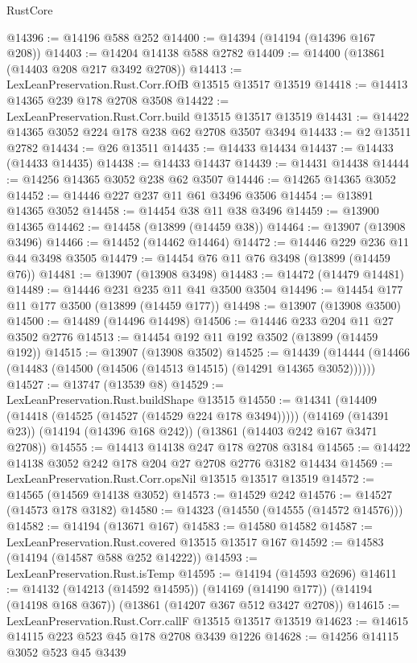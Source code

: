 \begin{lexlean}{RustCore}
\begin{coremodule}
@14396 := @14196 @588 @252
@14400 := @14394 (@14194 (@14396 @167 @208))
@14403 := @14204 @14138 @588 @2782
@14409 := @14400 (@13861 (@14403 @208 @217 @3492 @2708))
@14413 := LexLeanPreservation.Rust.Corr.fOfB @13515 @13517 @13519
@14418 := @14413 @14365 @239 @178 @2708 @3508
@14422 := LexLeanPreservation.Rust.Corr.build @13515 @13517 @13519
@14431 := @14422 @14365 @3052 @224 @178 @238 @62 @2708 @3507 @3494
@14433 := @2 @13511 @2782
@14434 := @26 @13511
@14435 := @14433 @14434
@14437 := @14433 (@14433 @14435)
@14438 := @14433 @14437
@14439 := @14431 @14438
@14444 := @14256 @14365 @3052 @238 @62 @3507
@14446 := @14265 @14365 @3052
@14452 := @14446 @227 @237 @11 @61 @3496 @3506
@14454 := @13891 @14365 @3052
@14458 := @14454 @38 @11 @38 @3496
@14459 := @13900 @14365
@14462 := @14458 (@13899 (@14459 @38))
@14464 := @13907 (@13908 @3496)
@14466 := @14452 (@14462 @14464)
@14472 := @14446 @229 @236 @11 @44 @3498 @3505
@14479 := @14454 @76 @11 @76 @3498 (@13899 (@14459 @76))
@14481 := @13907 (@13908 @3498)
@14483 := @14472 (@14479 @14481)
@14489 := @14446 @231 @235 @11 @41 @3500 @3504
@14496 := @14454 @177 @11 @177 @3500 (@13899 (@14459 @177))
@14498 := @13907 (@13908 @3500)
@14500 := @14489 (@14496 @14498)
@14506 := @14446 @233 @204 @11 @27 @3502 @2776
@14513 := @14454 @192 @11 @192 @3502 (@13899 (@14459 @192))
@14515 := @13907 (@13908 @3502)
@14525 := @14439 (@14444 (@14466 (@14483 (@14500 (@14506 (@14513 @14515) (@14291 @14365 @3052))))))
@14527 := @13747 (@13539 @8)
@14529 := LexLeanPreservation.Rust.buildShape @13515
@14550 := @14341
    (@14409 (@14418 (@14525 (@14527 (@14529 @224 @178 @3494)))))
    (@14169 (@14391 @23))
    (@14194 (@14396 @168 @242))
    (@13861 (@14403 @242 @167 @3471 @2708))
@14555 := @14413 @14138 @247 @178 @2708 @3184
@14565 := @14422 @14138 @3052 @242 @178 @204 @27 @2708 @2776 @3182 @14434
@14569 := LexLeanPreservation.Rust.Corr.opsNil @13515 @13517 @13519
@14572 := @14565 (@14569 @14138 @3052)
@14573 := @14529 @242
@14576 := @14527 (@14573 @178 @3182)
@14580 := @14323 (@14550 (@14555 (@14572 @14576)))
@14582 := @14194 (@13671 @167)
@14583 := @14580 @14582
@14587 := LexLeanPreservation.Rust.covered @13515 @13517 @167
@14592 := @14583 (@14194 (@14587 @588 @252 @14222))
@14593 := LexLeanPreservation.Rust.isTemp
@14595 := @14194 (@14593 @2696)
@14611 := @14132
    (@14213 (@14592 @14595))
    (@14169 (@14190 @177))
    (@14194 (@14198 @168 @367))
    (@13861 (@14207 @367 @512 @3427 @2708))
@14615 := LexLeanPreservation.Rust.Corr.callF @13515 @13517 @13519
@14623 := @14615 @14115 @223 @523 @45 @178 @2708 @3439 @1226
@14628 := @14256 @14115 @3052 @523 @45 @3439

\end{coremodule}
\end{lexlean}
